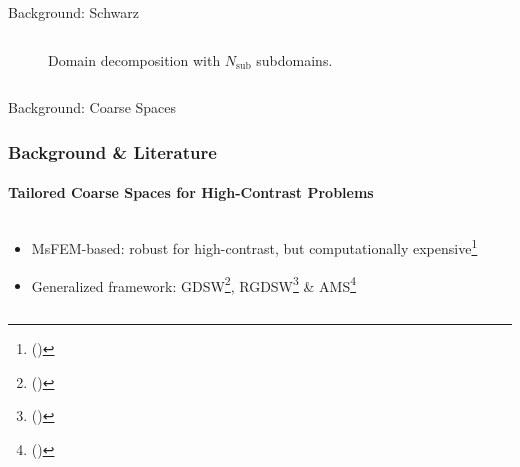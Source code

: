 \begin{frame}[label=background,fragile]{Background: Schwarz}
\begin{columns}[T,onlytextwidth]
\begin{column}{.49\textwidth}
{\begin{figure}[H]
                    \centering
                    
                    \caption{Domain decomposition with $N_{\text{sub}}$ subdomains.}
                \end{figure}
            }
        \end{column}
    \end{columns}
\end{frame}

\footerinfootnotestrue
\begin{frame}[label=background, fragile]{Background: Coarse Spaces}
    \frametitle{Background \& Literature}
    \framesubtitle{Tailored Coarse Spaces for High-Contrast Problems}
    \begin{columns}[T,onlytextwidth]
        \begin{column}{.5\textwidth}
            \begin{itemize}
                \item<1-> MsFEM-based: robust for high-contrast, but computationally expensive\footnote[frame]{\citeauthor{acms_coarse_space_Heinlein2018} (\citeyear{acms_coarse_space_Heinlein2018})}
                \item<2-> Generalized framework: GDSW\footnote[frame]{\citeauthor{gdsw_coarse_space_Dohrmann2008} (\citeyear{gdsw_coarse_space_Dohrmann2008})}, RGDSW\footnote[frame]{\citeauthor{rgdsw_coarse_space_Dohrmann2017} (\citeyear{rgdsw_coarse_space_Dohrmann2017})} \& AMS\footnote[frame]{\citeauthor{ams_coarse_space_comp_study_Alves2024} (\citeyear{ams_coarse_space_comp_study_Alves2024})}
            \end{itemize}
        \end{column}
        \begin{column}{.5\textwidth}
        \end{column}
    \end{columns}

\end{frame}
